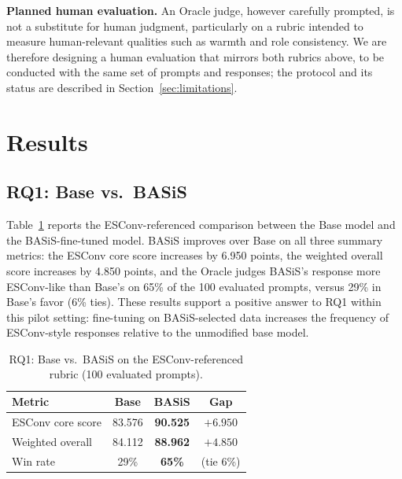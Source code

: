 \documentclass[manuscript,review,anonymous]{acmart}
\begin{document}
\textbf{Planned human evaluation.} An Oracle judge, however carefully prompted, is not a substitute for human judgment, particularly on a rubric intended to measure human-relevant qualities such as warmth and role consistency. We are therefore designing a human evaluation that mirrors both rubrics above, to be conducted with the same set of prompts and responses; the protocol and its status are described in Section~\ref{sec:limitations}.


\section{Results}
\label{sec:results}

\subsection{RQ1: Base vs.\ BASiS}
Table~\ref{tab:base_vs_basis} reports the ESConv-referenced comparison between the Base model and the BASiS-fine-tuned model. BASiS improves over Base on all three summary metrics: the ESConv core score increases by 6.950 points, the weighted overall score increases by 4.850 points, and the Oracle judges BASiS's response more ESConv-like than Base's on 65\% of the 100 evaluated prompts, versus 29\% in Base's favor (6\% ties). These results support a positive answer to RQ1 within this pilot setting: fine-tuning on BASiS-selected data increases the frequency of ESConv-style responses relative to the unmodified base model.

\begin{table}[t]
  \caption{RQ1: Base vs.\ BASiS on the ESConv-referenced rubric (100 evaluated prompts).}
  \label{tab:base_vs_basis}
  \begin{tabular}{lccc}
    \toprule
    Metric & Base & BASiS & Gap \\
    \midrule
    ESConv core score  & 83.576 & \textbf{90.525} & $+6.950$ \\
    Weighted overall    & 84.112 & \textbf{88.962} & $+4.850$ \\
    Win rate             & 29\%   & \textbf{65\%}   & (tie 6\%) \\
    \bottomrule
  \end{tabular}
\end{table}
\end{document}
